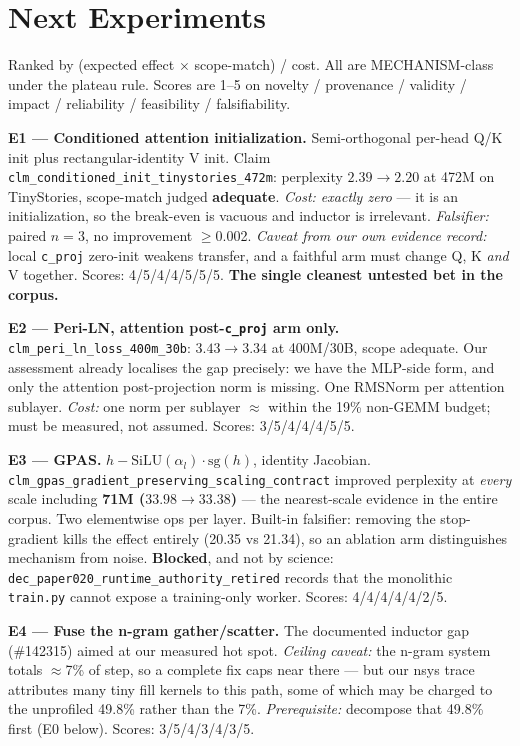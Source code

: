 \documentclass{article}
\begin{document}
\section{Next Experiments}
Ranked by (expected effect $\times$ scope-match) / cost. All are MECHANISM-class under the plateau rule. Scores are 1--5 on novelty / provenance / validity / impact / reliability / feasibility / falsifiability.

\textbf{E1 --- Conditioned attention initialization.} Semi-orthogonal per-head Q/K init plus rectangular-identity V init. Claim \texttt{clm\_conditioned\_init\_tinystories\_472m}: perplexity $2.39 \to 2.20$ at 472M on TinyStories, scope-match judged \textbf{adequate}. \emph{Cost: exactly zero} --- it is an initialization, so the break-even is vacuous and inductor is irrelevant. \emph{Falsifier:} paired $n{=}3$, no improvement $\ge$0.002. \emph{Caveat from our own evidence record:} local \texttt{c\_proj} zero-init weakens transfer, and a faithful arm must change Q, K \emph{and} V together. Scores: 4/5/4/4/5/5/5. \textbf{The single cleanest untested bet in the corpus.}

\textbf{E2 --- Peri-LN, attention post-\texttt{c\_proj} arm only.} \texttt{clm\_peri\_ln\_loss\_400m\_30b}: $3.43 \to 3.34$ at 400M/30B, scope adequate. Our assessment already localises the gap precisely: we have the MLP-side form, and only the attention post-projection norm is missing. One RMSNorm per attention sublayer. \emph{Cost:} one norm per sublayer $\approx$ within the 19\% non-GEMM budget; must be measured, not assumed. Scores: 3/5/4/4/4/5/5.

\textbf{E3 --- GPAS.} $h - \mathrm{SiLU}(\alpha_l)\cdot\mathrm{sg}(h)$, identity Jacobian. \texttt{clm\_gpas\_gradient\_preserving\_scaling\_contract} improved perplexity at \emph{every} scale including \textbf{71M ($33.98 \to 33.38$)} --- the nearest-scale evidence in the entire corpus. Two elementwise ops per layer. Built-in falsifier: removing the stop-gradient kills the effect entirely (20.35 vs 21.34), so an ablation arm distinguishes mechanism from noise. \textbf{Blocked}, and not by science: \texttt{dec\_paper020\_runtime\_authority\_retired} records that the monolithic \texttt{train.py} cannot expose a training-only worker. Scores: 4/4/4/4/4/2/5.

\textbf{E4 --- Fuse the n-gram gather/scatter.} The documented inductor gap (\#142315) aimed at our measured hot spot. \emph{Ceiling caveat:} the n-gram system totals $\approx$7\% of step, so a complete fix caps near there --- but our nsys trace attributes many tiny fill kernels to this path, some of which may be charged to the unprofiled 49.8\% rather than the 7\%. \emph{Prerequisite:} decompose that 49.8\% first (E0 below). Scores: 3/5/4/3/4/3/5.
\end{document}
